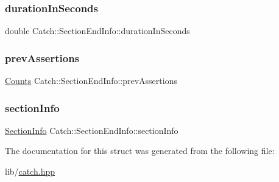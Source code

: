 \subsubsection{\texorpdfstring{duration\+In\+Seconds}{durationInSeconds}}
{\footnotesize\ttfamily double Catch\+::\+Section\+End\+Info\+::duration\+In\+Seconds}

\hypertarget{struct_catch_1_1_section_end_info_ae70b154cbc05b5dd2901d97f89303d8c}{}\label{struct_catch_1_1_section_end_info_ae70b154cbc05b5dd2901d97f89303d8c} 
\subsubsection{\texorpdfstring{prev\+Assertions}{prevAssertions}}
{\footnotesize\ttfamily \hyperlink{struct_catch_1_1_counts}{Counts} Catch\+::\+Section\+End\+Info\+::prev\+Assertions}

\hypertarget{struct_catch_1_1_section_end_info_a2d44793392cb83735d086d726822abe9}{}\label{struct_catch_1_1_section_end_info_a2d44793392cb83735d086d726822abe9} 
\subsubsection{\texorpdfstring{section\+Info}{sectionInfo}}
{\footnotesize\ttfamily \hyperlink{struct_catch_1_1_section_info}{Section\+Info} Catch\+::\+Section\+End\+Info\+::section\+Info}



The documentation for this struct was generated from the following file\+:\begin{DoxyCompactItemize}
\item 
lib/\hyperlink{catch_8hpp}{catch.\+hpp}\end{DoxyCompactItemize}
